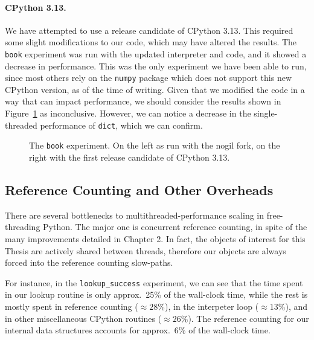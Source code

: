 \paragraph{CPython 3.13.}
We have attempted to use a release candidate of CPython 3.13.
This required some slight modifications to our code, which may have altered the results.
The \texttt{book} experiment was run with the updated interpreter and code, and it showed a decrease in performance.
This was the only experiment we have been able to run, since most others rely on the \texttt{numpy} package which does not support this new CPython version, as of the time of writing.
Given that we modified the code in a way that can impact performance, we should consider the results shown in Figure~\ref{fig:book-3.13} as inconclusive.
However, we can notice a decrease in the single-threaded performance of \texttt{dict}, which we can confirm.

\begin{figure}
    \begin{centering}
        \scalebox{0.4}{}%
        \scalebox{0.4}{}
        \caption{The \texttt{book} experiment. On the left as run with the nogil fork, on the right with the first release candidate of CPython 3.13.}
        \label{fig:book-3.13}
    \end{centering}
\end{figure}

\subsection{Reference Counting and Other Overheads}\label{subsec:measurements-overheads}

There are several bottlenecks to multithreaded-performance scaling in free-threading Python.
The major one is concurrent reference counting, in spite of the many improvements detailed in Chapter 2.
In fact, the objects of interest for this Thesis are actively shared between threads, therefore our objects are always forced into the reference counting slow-paths.

For instance, in the \texttt{lookup\_success} experiment, we can see that the time spent in our lookup routine is only approx.\ 25\% of the wall-clock time, while the rest is mostly spent in reference counting ($\approx28\%$), in the interpeter loop ($\approx13\%$), and in other miscellaneous CPython routines ($\approx26\%$).
The reference counting for our internal data structures accounts for approx.\ 6\% of the wall-clock time.

